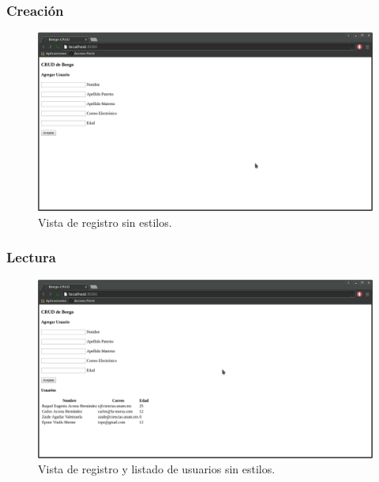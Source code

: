 \documentclass[12pt]{article}
\begin{document}
\subsubsection{Creación}\label{sec:add}
\begin{figure}[H]
  \includegraphics[width=1\textwidth]{index}
  \caption{Vista de registro sin estilos.}
\end{figure}
\subsubsection{Lectura}\label{sec:read}
\begin{figure}[H]
  \includegraphics[width=1\textwidth]{read}
  \caption{Vista de registro y listado de usuarios sin estilos.}
\end{figure}
\end{document}
